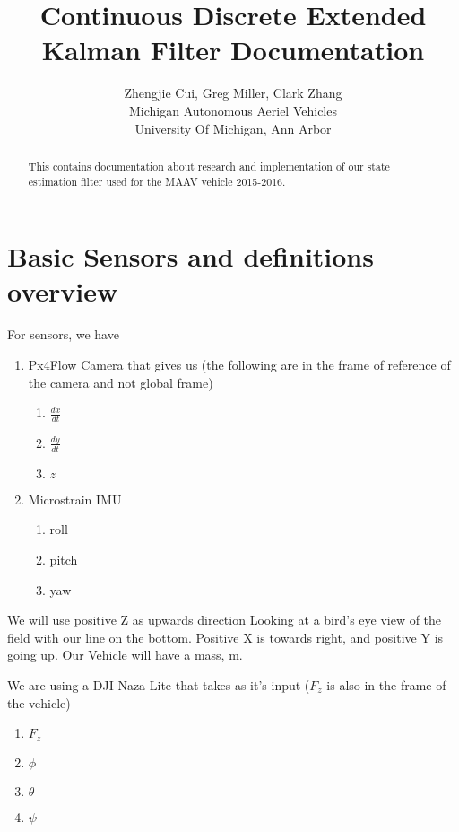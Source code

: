 \documentclass[12pt]{article}
\begin{document}
\title{Continuous Discrete Extended Kalman Filter Documentation}

\author{Zhengjie Cui, Greg Miller, Clark Zhang \\ 
Michigan Autonomous Aeriel Vehicles \\
University Of Michigan, Ann Arbor}

\maketitle
\begin{abstract}
This contains documentation about research and implementation of our state estimation filter used for the MAAV vehicle 2015-2016.
\end{abstract}

\section{Basic Sensors and definitions overview}
For sensors, we have
\begin{enumerate}
\item{
Px4Flow Camera that gives us (the following are in the frame of reference of the camera and not global frame)
\begin{enumerate}
\item $\frac{dx}{dt}$
\item $\frac{dy}{dt}$
\item $z$
\end{enumerate}
}
\item{
Microstrain IMU
\begin{enumerate}
\item roll
\item pitch
\item yaw
\end{enumerate}
}
\end{enumerate}

We will use positive Z as upwards direction
Looking at a bird's eye view of the field with our line on the bottom.
Positive X is towards right, and positive Y is going up. Our Vehicle will have a mass, m.

We are using a DJI Naza Lite
that takes as it's input ($F_{z}$ is also in the frame of the vehicle)
\begin{enumerate}
\item $F_{z}$
\item $\phi$
\item $\theta$
\item $\dot{\psi}$
\end{enumerate}
\end{document}
